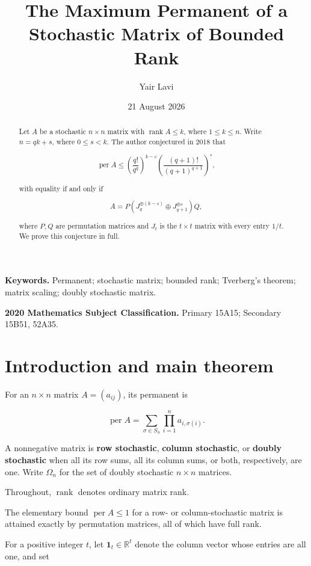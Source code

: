 \documentclass[11pt]{article}
\title{The Maximum Permanent of a Stochastic Matrix of Bounded Rank}
\author{Yair Lavi}
\date{21 August 2026}
\theoremstyle{remark}
\begin{document}
\maketitle

\begin{abstract}

Let \(A\) be a stochastic \(n\times n\) matrix
with \(\operatorname{rank}A\leq k\), where \(1\leq k\leq n\). Write
\(n=qk+s\), where \(0\leq s<k\). The author conjectured in 2018 that

\[
 \operatorname{per}A\leq
 \left(\frac{q!}{q^q}\right)^{k-s}
 \left(\frac{(q+1)!}{(q+1)^{q+1}}\right)^s,
\]

with equality if and only if

\[
 A=P\left(J_q^{\oplus(k-s)}\oplus J_{q+1}^{\oplus s}\right)Q,
\]

where \(P,Q\) are permutation matrices and \(J_t\) is the \(t\times t\)
matrix with every entry \(1/t\). We prove this conjecture in full.
\end{abstract}

\noindent\textbf{Keywords.} Permanent; stochastic matrix; bounded rank;
Tverberg's theorem; matrix scaling; doubly stochastic matrix.

\noindent\textbf{2020 Mathematics Subject Classification.} Primary 15A15;
Secondary 15B51, 52A35.

\section{Introduction and main theorem}

For an \(n\times n\) matrix \(A=(a_{ij})\), its permanent is

\[
 \operatorname{per}A
 =\sum_{\sigma\in S_n}\prod_{i=1}^n a_{i,\sigma(i)}.
 \tag{1.1}
\]

A nonnegative matrix is \textbf{row stochastic}, \textbf{column stochastic}, or
\textbf{doubly stochastic} when all its row sums, all its column sums, or both,
respectively, are one. Write \(\Omega_n\) for the set of doubly stochastic
\(n\times n\) matrices.

Throughout, \(\operatorname{rank}\) denotes ordinary matrix rank.

The elementary bound \(\operatorname{per}A\leq1\) for a row- or
column-stochastic matrix is attained exactly by permutation matrices, all of
which have full rank.

For a positive integer \(t\), let \(\mathbf1_t\in\mathbb R^t\) denote the
column vector whose entries are all one, and set
\end{document}

